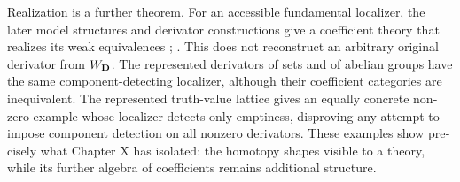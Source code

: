 \begin{otherlanguage}{english}
Realization is a further theorem. For an accessible fundamental localizer, the later model structures and derivator constructions give a coefficient theory that realizes its weak equivalences \citep[Theorems~4.2.15 and 5.2.15]{Cisinski2006}; \citep[Theorem~6.11 and its dual]{Cisinski2003}. This does not reconstruct an arbitrary original derivator from $W_{\mathbf{D}}$. The represented derivators of sets and of abelian groups have the same component-detecting localizer, although their coefficient categories are inequivalent. The represented truth-value lattice gives an equally concrete nonzero example whose localizer detects only emptiness, disproving any attempt to impose component detection on all nonzero derivators. These examples show precisely what Chapter X has isolated: the homotopy shapes visible to a theory, while its further algebra of coefficients remains additional structure.
\end{otherlanguage}
\dgrchunkend
